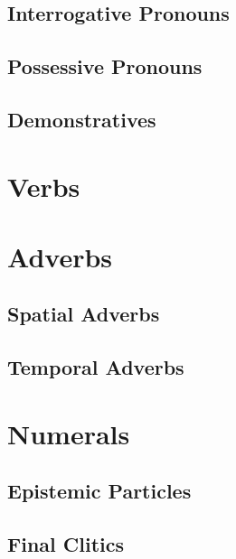 \subsection{Interrogative Pronouns}
\label{subsec:22:interrogative pronouns}


\subsection{Possessive Pronouns}
\label{subsec:22:possessive pronouns}

\subsection{Demonstratives}
\label{subsec:22:demonstratives}

\section{Verbs}
\label{sec:22:verbs}

\section{Adverbs}
\label{sec:22:adverbs}

\subsection{Spatial Adverbs}
\label{subsec:22:spatial adverbs}

\subsection{Temporal Adverbs} 
\label{subsec:22:temporal adverbs}

\section{Numerals}
\label{sec:22:numerals}

\subsection{Epistemic Particles}
\label{subsec:22:epistemic particles}

\subsection{Final Clitics}
\label{subsec:22:final clitics}

